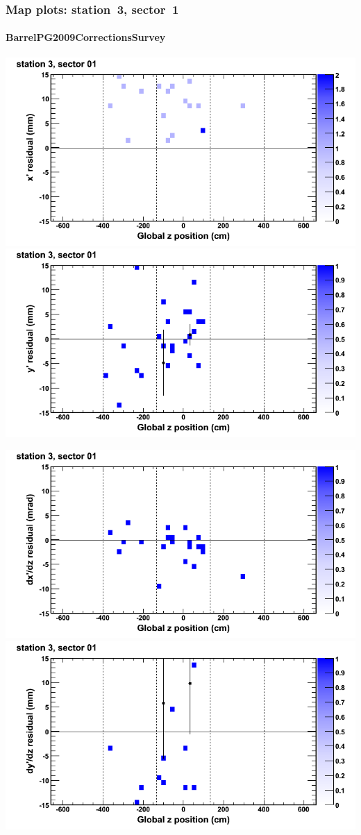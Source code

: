 \documentclass[compress]{beamer}
\begin{document}
\begin{frame}
\frametitle{Map plots: station~3, sector~1}
\framesubtitle{BarrelPG2009CorrectionsSurvey}
\includegraphics[width=0.5\linewidth]{mapplots_01/DTvsz_st3sec01_x.png}
\includegraphics[width=0.5\linewidth]{mapplots_01/DTvsz_st3sec01_y.png}

\includegraphics[width=0.5\linewidth]{mapplots_01/DTvsz_st3sec01_dxdz.png}
\includegraphics[width=0.5\linewidth]{mapplots_01/DTvsz_st3sec01_dydz.png}
\end{frame}
\end{document}
